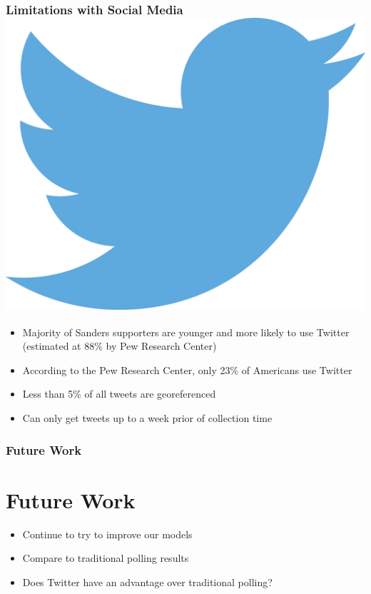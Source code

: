 \documentclass[xcolor=dvipsnames]{beamer}
\begin{document}
\begin{frame}
\frametitle{Limitations with Social Media \hfill \hfill \includegraphics[scale=.1]{twitterlogo.png}}
\begin{itemize}
	\item Majority of Sanders supporters are younger and more likely to use Twitter (estimated at 88\% by Pew Research Center) \pause 
	\item According to the Pew Research Center, only 23\% of Americans use Twitter \pause  
	\item Less than 5\% of all tweets are georeferenced \pause 
	\item Can only get tweets up to a week prior of collection time \pause 

	
\end{itemize}

\end{frame}

\begin{frame}
\frametitle{Future Work}
\section{Future Work}
\begin{itemize}
\item Continue to try to improve our models 
\item Compare to traditional polling results
\item Does Twitter have an advantage over traditional polling?
\end{itemize}
\end{frame}
\end{document}
